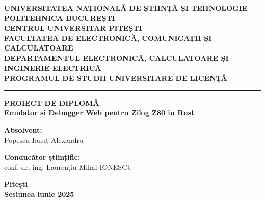 \documentclass[titlepage,12pt]{article}
\begin{document}
\setcounter{page}{1}
\pagestyle{plain}
\begin{titlepage}
    \thispagestyle{plain}
    {\arialfont %
    \begin{flushleft}
        \textbf{UNIVERSITATEA NAȚIONALĂ DE ȘTIINȚĂ ȘI TEHNOLOGIE POLITEHNICA BUCUREȘTI}\\[0.1cm]
        \textbf{CENTRUL UNIVERSITAR PITEȘTI}\\[0.1cm]
        \textbf{FACULTATEA DE ELECTRONICĂ, COMUNICAȚII ȘI CALCULATOARE}\\[0.1cm]
        \textbf{DEPARTAMENTUL ELECTRONICĂ, CALCULATOARE ȘI INGINERIE ELECTRICĂ}\\[0.1cm]
        \textbf{PROGRAMUL DE STUDII UNIVERSITARE DE LICENȚĂ}\\[0.3cm]
        \hrule
    \end{flushleft}

        \vspace{6cm}
    \begin{center}
        {\Huge \textbf{PROIECT DE DIPLOMĂ}}\\[2cm]
        {\LARGE \textbf{Emulator si Debugger Web pentru Zilog Z80 in Rust}}\\[5cm]
        \noindent
        \begin{minipage}{0.45\textwidth}
            \textbf{Absolvent:}\\
            Popescu Ionuț-Alexandru
        \end{minipage}
        \hfill
        \begin{minipage}{0.45\textwidth}
            \vspace{1cm}
            \raggedleft
            \textbf{Conducător științific:}\\
            conf. dr. ing. Laurențiu-Mihai IONESCU
        \end{minipage}

        \vspace{2cm}
        \vfill
        \textbf{Pitești}\\[0.1cm]
        \textbf{Sesiunea iunie 2025}
    \end{center}
    }
\end{titlepage}
\newpage
\setcounter{page}{2}

\renewcommand{\contentsname}{Cuprins}
\renewcommand{\listfigurename}{Lista figurilor}
\renewcommand{\listtablename}{Lista tabelelor}
\renewcommand{\figurename}{Figura}
\renewcommand{\tablename}{Tabela}
\renewcommand{\lstlistingname}{Cod}
\tableofcontents
\clearpage
\listoffigures
\clearpage
\listoftables
\clearpage
\end{document}
